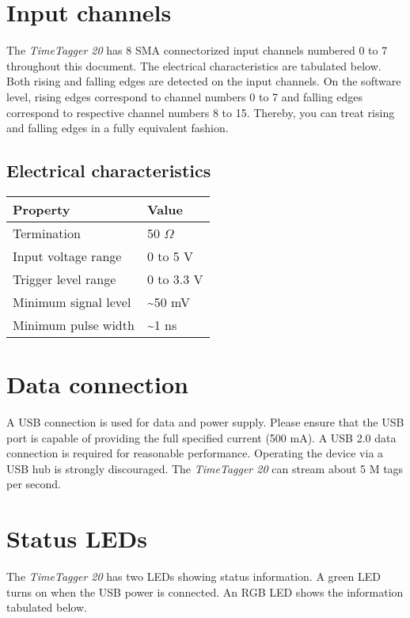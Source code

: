 \documentclass[letterpaper,10pt,english]{sphinxmanual}
\begin{document}
\section{Input channels}
\label{sections/hardware:input-channels}
The \emph{TimeTagger 20} has 8 SMA connectorized input channels numbered 0 to 7 throughout this document. The electrical
characteristics are tabulated below. Both rising and falling edges are detected on the input channels.
On the software level, rising edges correspond to channel numbers 0 to 7 and falling edges correspond to
respective channel numbers 8 to 15. Thereby, you can treat rising and falling edges in a fully equivalent fashion.


\subsection{Electrical characteristics}
\label{sections/hardware:electrical-characteristics}
\noindent\begin{tabulary}{\linewidth}{|L|L|}
\hline
\textsf{\relax 
Property
} & \textsf{\relax 
Value
}\\
\hline
Termination
 & 
50  \(\Omega\)
\\
\hline
Input voltage range
 & 
0 to 5 V
\\
\hline
Trigger level range
 & 
0 to 3.3 V
\\
\hline
Minimum signal level
 & 
\textasciitilde{}50 mV
\\
\hline
Minimum pulse width
 & 
\textasciitilde{}1 ns
\\
\hline\end{tabulary}



\section{Data connection}
\label{sections/hardware:data-connection}
A USB connection is used for data and power supply. Please ensure that the USB port is capable of providing the full
specified current (500 mA). A USB 2.0 data connection is required for reasonable performance. Operating the device via
a USB hub is strongly discouraged. The \emph{TimeTagger 20} can stream about 5 M tags per second.


\section{Status LEDs}
\label{sections/hardware:status-leds}
The \emph{TimeTagger 20} has two LEDs showing status information. A green LED turns on when the USB power is connected.
An RGB LED shows the information tabulated below.
\end{document}
